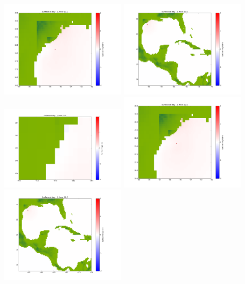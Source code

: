 \documentclass[11pt]{article}
\begin{document}
\includegraphics[width=0.475\textwidth]{frame0058fig1002.png}
\vskip 10pt 
\includegraphics[width=0.475\textwidth]{frame0058fig1003.png}
\vskip 10pt 
\includegraphics[width=0.475\textwidth]{frame0059fig1001.png}
\includegraphics[width=0.475\textwidth]{frame0059fig1002.png}
\vskip 10pt 
\includegraphics[width=0.475\textwidth]{frame0059fig1003.png}
\end{document}
